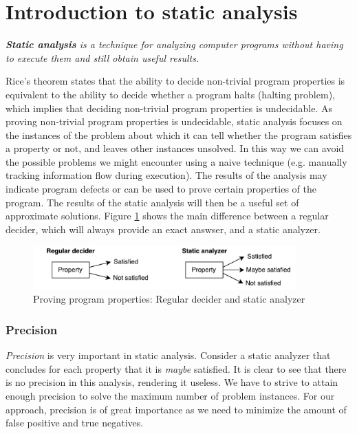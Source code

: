 \section{Introduction to static analysis}
\label{sec:staticAnalysis}

\begin{definition}
\textit{\textbf{Static analysis} is a technique for analyzing computer programs without having to execute them and still obtain useful results.}
\end{definition}

Rice's theorem states that the ability to decide non-trivial program properties is equivalent to the ability to decide whether a program halts (halting problem), which implies that deciding non-trivial program properties is undecidable. As proving non-trivial program properties is undecidable, static analysis focuses on the instances of the problem about which it can tell whether the program satisfies a property or not, and leaves other instances unsolved. In this way we can avoid the possible problems we might encounter using a naive technique (e.g. manually tracking information flow during execution). The results of the analysis may indicate program defects or can be used to prove certain properties of the program.  The results of the static analysis will then be a useful set of approximate solutions. Figure \ref{fig:decider} shows the main difference between a regular decider, which will always provide an exact answser, and a static analyzer.

\begin{figure}[!h]
    \centering
      \includegraphics[width=0.9\textwidth]{images/decider} 
      \caption{Proving program properties: Regular decider and static analyzer}
    \label{fig:decider}
\end{figure}

\subsubsection*{Precision}

\textit{Precision} is very important in static analysis. Consider a static analyzer that concludes for each property that it is \textit{maybe} satisfied. It is clear to see that there is no precision in this analysis, rendering it useless. We have to strive to attain enough precision to solve the maximum number of problem instances. For our approach, precision is of great importance as we need to minimize the amount of false positive and true negatives.


